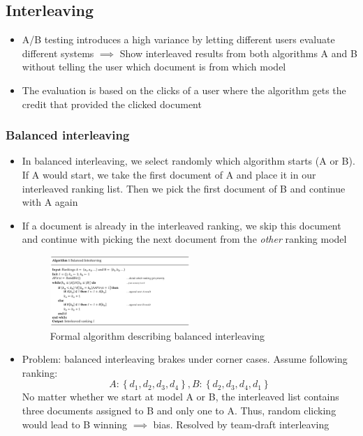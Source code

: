 \subsection{Interleaving}
\begin{itemize}
	\item A/B testing introduces a high variance by letting different users evaluate different systems $\implies$ Show interleaved results from both algorithms A and B without telling the user which document is from which model
	\item The evaluation is based on the clicks of a user where the algorithm gets the credit that provided the clicked document
\end{itemize}
\subsubsection{Balanced interleaving}
\begin{itemize}
	\item In balanced interleaving, we select randomly which algorithm starts (A or B). If A would start, we take the first document of A and place it in our interleaved ranking list. Then we pick the first document of B and continue with A again
	\item If a document is already in the interleaved ranking, we skip this document and continue with picking the next document from the \textit{other} ranking model 
	\begin{figure}[ht]
		\centering
		\includegraphics[width=0.5\textwidth]{figures/online_eval_balanced_interleaving.png}
		\caption{Formal algorithm describing balanced interleaving}
		\label{img:online_eval_balanced_interleaving}
	\end{figure}
	\item Problem: balanced interleaving brakes under corner cases. Assume following ranking:
	$$A: \left\{d_1, d_2, d_3, d_4\right\}, B: \left\{d_2, d_3, d_4, d_1\right\}$$
	No matter whether we start at model A or B, the interleaved list contains three documents assigned to B and only one to A. Thus, random clicking would lead to B winning $\implies$ bias. Resolved by team-draft interleaving
\end{itemize}
